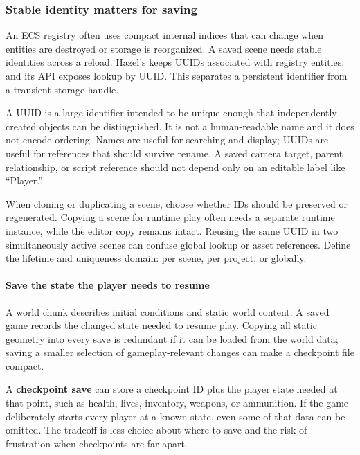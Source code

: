 \subsubsection{Stable identity matters for saving}\label{06-engine-ii-ch031-stable-identity-matters-for-saving}

\hypertarget{06-engine-ii-ch031-stable-identity-matters-for-saving}{}

An ECS registry often uses compact internal indices that can change when entities are destroyed or storage is reorganized. A saved scene needs stable identities across a reload. Hazel's  keeps UUIDs associated with registry entities, and its API exposes lookup by UUID. This separates a persistent identifier from a transient storage handle.

A UUID is a large identifier intended to be unique enough that independently created objects can be distinguished. It is not a human-readable name and it does not encode ordering. Names are useful for searching and display; UUIDs are useful for references that should survive rename. A saved camera target, parent relationship, or script reference should not depend only on an editable label like ``Player.''

When cloning or duplicating a scene, choose whether IDs should be preserved or regenerated. Copying a scene for runtime play often needs a separate runtime instance, while the editor copy remains intact. Reusing the same UUID in two simultaneously active scenes can confuse global lookup or asset references. Define the lifetime and uniqueness domain: per scene, per project, or globally.

\paragraph{Save the state the player needs to resume}\label{06-engine-ii-ch031-save-the-state-the-player-needs-to-resume}

\hypertarget{06-engine-ii-ch031-save-the-state-the-player-needs-to-resume}{}

A world chunk describes initial conditions and static world content. A saved game records the changed state needed to resume play. Copying all static geometry into every save is redundant if it can be loaded from the world data; saving a smaller selection of gameplay-relevant changes can make a checkpoint file compact.

A \textbf{checkpoint save} can store a checkpoint ID plus the player state needed at that point, such as health, lives, inventory, weapons, or ammunition. If the game deliberately starts every player at a known state, even some of that data can be omitted. The tradeoff is less choice about where to save and the risk of frustration when checkpoints are far apart.

